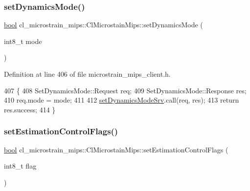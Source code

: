 \subsubsection{\texorpdfstring{set\+Dynamics\+Mode()}{setDynamicsMode()}}
{\footnotesize\ttfamily \hyperlink{classbool}{bool} cl\+\_\+microstrain\+\_\+mips\+::\+Cl\+Microstain\+Mips\+::set\+Dynamics\+Mode (\begin{DoxyParamCaption}\item[{int8\+\_\+t}]{mode }\end{DoxyParamCaption})\hspace{0.3cm}{\ttfamily [inline]}}



Definition at line 406 of file microstrain\+\_\+mips\+\_\+client.\+h.


\begin{DoxyCode}
407     \{
408         SetDynamicsMode::Request req;
409         SetDynamicsMode::Response res;
410         req.mode = mode;
411 
412         \hyperlink{classcl__microstrain__mips_1_1ClMicrostainMips_a43a684f4010debc4a2ba17d9784712d6}{setDynamicsModeSrv}.call(req, res);
413         \textcolor{keywordflow}{return} res.success;
414     \}
\end{DoxyCode}
\mbox{\label{classcl__microstrain__mips_1_1ClMicrostainMips_a8b5a76095196ef5a351804991ea9e23f}} 
\subsubsection{\texorpdfstring{set\+Estimation\+Control\+Flags()}{setEstimationControlFlags()}}
{\footnotesize\ttfamily \hyperlink{classbool}{bool} cl\+\_\+microstrain\+\_\+mips\+::\+Cl\+Microstain\+Mips\+::set\+Estimation\+Control\+Flags (\begin{DoxyParamCaption}\item[{int8\+\_\+t}]{flag }\end{DoxyParamCaption})\hspace{0.3cm}{\ttfamily [inline]}}



